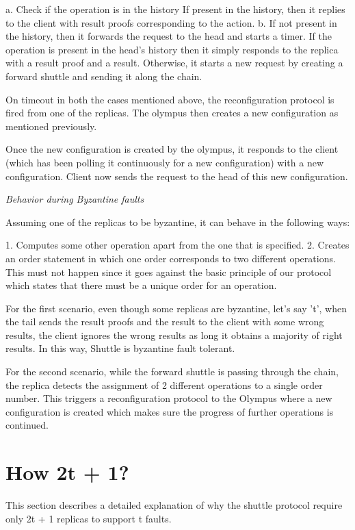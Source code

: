 \documentclass[letterpaper, 10 pt, conference]{ieeeconf}  %
\begin{document}
a. Check if the operation is in the history
   If present in the history, then it replies to the client with result proofs corresponding to the action.
b. If not present in the history, then it forwards the request to the head and starts a timer.
    If the operation is present in the head's history then it simply responds to the replica with a result proof and a result. Otherwise, it starts a new request by creating a forward shuttle and sending it along the chain.
    
On timeout in both the cases mentioned above, the reconfiguration protocol is fired from one of the replicas. The olympus then creates a new configuration as mentioned previously.

Once the new configuration is created by the olympus, it responds to the client (which has been polling it continuously for a new configuration) with a new configuration. Client now sends the request to the head of this new configuration.

\textit{Behavior during Byzantine faults}

Assuming one of the replicas to be byzantine, it can behave in the following ways:

1. Computes some other operation apart from the one that is specified.
2. Creates an order statement in which one order corresponds to two different operations. This must not happen since it goes against the basic principle of our protocol which states that there must be a unique order for an operation.

For the first scenario, even though some replicas are byzantine, let's say 't', when the tail sends the result proofs and the result to the client with some wrong results, the client ignores the wrong results as long it obtains a majority of right results. In this way, Shuttle is byzantine fault tolerant.

For the second scenario, while the forward shuttle is passing through the chain, the replica detects the assignment of 2 different operations to a single order number. This triggers a reconfiguration protocol to the Olympus where a new configuration is created which makes sure the progress of further operations is continued.

\section{How 2t + 1?}
This section describes a detailed explanation of why the shuttle protocol require only 2t + 1 replicas to support t faults.\smallskip
\end{document}
